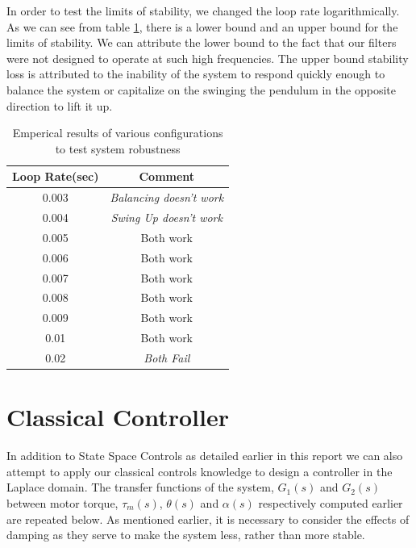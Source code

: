 \documentclass{article}
\theoremstyle{plain}
\theoremstyle{definition}
\theoremstyle{remark}
\begin{document}
In order to test the limits of stability, we changed the loop rate logarithmically. As we can see from table \ref{q7}, there is a lower bound and an upper bound for the limits of stability. We can attribute the lower bound to the fact that our filters were not designed to operate at such high frequencies. The upper bound stability loss is attributed to the inability of the system to respond quickly enough to balance the system or capitalize on the swinging the pendulum in the opposite direction to lift it up.
\begin{table}[htb]
\begin{center}
    \begin{tabular}{|c|c|}
        \hline
        \textbf{Loop Rate}(sec) & \textbf{Comment}\\ \hline\hline
        0.003     & \emph{Balancing doesn't work} \\ \hline
        0.004     & \emph{Swing Up doesn't work } \\ \hline
        0.005     & Both work                    \\ \hline
        0.006     & Both work                    \\ \hline
        0.007     & Both work                    \\ \hline
        0.008     & Both work                    \\ \hline
        0.009     & Both work                    \\ \hline
        0.01      & Both work                    \\ \hline
        0.02      & \emph{Both Fail}             \\
        \hline
    \end{tabular}
\end{center}
\caption{Emperical results of various configurations to test system robustness}
\label{q7}
\end{table}


\section{Classical Controller}

In addition to State Space Controls as detailed earlier in this report we can also attempt to apply our classical controls knowledge to design a controller in the Laplace domain.  The transfer functions of the system, $G_1(s)$ and $G_2(s)$ between motor torque, $\tau_m(s)$, $\theta(s)$ and  $\alpha(s)$ respectively computed earlier are repeated below.  As mentioned earlier, it is necessary to consider the effects of damping as they serve to make the system less, rather than more stable.  
\end{document}
